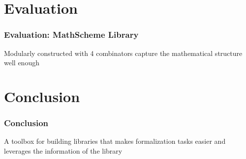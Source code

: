\documentclass[t,12pt,numbers,fleqn,usenames,xcolor=dvipsnames]{beamer}
\begin{document}
\section{Evaluation}
\begin{frame}
\frametitle{Evaluation: MathScheme Library}
Modularly constructed with 4 combinators 
capture the mathematical structure well enough 
\end{frame}

\section{Conclusion}
\begin{frame}
\frametitle{Conclusion}
A toolbox for building libraries that makes formalization tasks easier and leverages the information of the library 
\end{frame}
\end{document}
